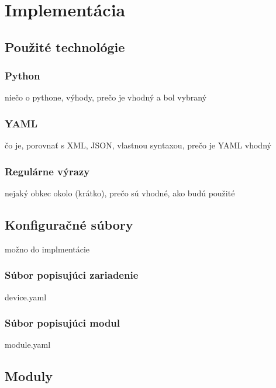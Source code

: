 \chapter{Implementácia}

\section{Použité technológie}
 \subsection{Python}
 niečo o pythone, výhody, prečo je vhodný a bol vybraný
 \subsection{YAML}
 čo je, porovnať s XML, JSON, vlastnou syntaxou, prečo je YAML vhodný
 \subsection{Regulárne výrazy}
 nejaký obkec okolo (krátko), prečo sú vhodné, ako budú použité

\section{Konfiguračné súbory}
možno do implmentácie
\subsection{Súbor popisujúci zariadenie}
device.yaml
\subsection{Súbor popisujúci modul}
module.yaml

\section{Moduly}


